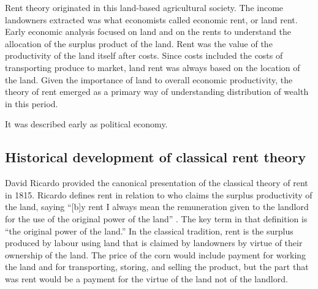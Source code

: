 Rent theory originated in this land-based agricultural society. The income landowners extracted was what economists called \gls{economic rent}, or \gls{land rent}. Early economic analysis focused on land and on the rents to understand the allocation of the surplus product of the land. Rent was the value of the productivity of the land itself after costs. Since costs included the costs of transporting produce to market, land rent was always based on the location of the land. %
Given the importance of land to overall economic productivity, the theory of rent emerged as a primary way of understanding distribution of wealth in this period. 

It was described early as political economy.

\subsection{Historical development of classical rent theory}


David Ricardo provided the canonical presentation of the classical theory of rent \cite{ricardoEssayInfluenceLow1815} in 1815. 
 Ricardo defines rent in relation to who claims the surplus productivity of the land, %
saying ``[b]y rent I always mean the remuneration given to the landlord for the use of the original power of the land'' \cite{ricardoEssayInfluenceLow1815}. The key term in that definition is ``the original power of the land.'' In the classical tradition, rent is the surplus produced by labour using land that is claimed by landowners by virtue of their ownership of the land. The price of the corn would include payment for working the land and for transporting, storing, and selling the product, but the part that was rent would be a payment for the virtue of the land not of the landlord.

